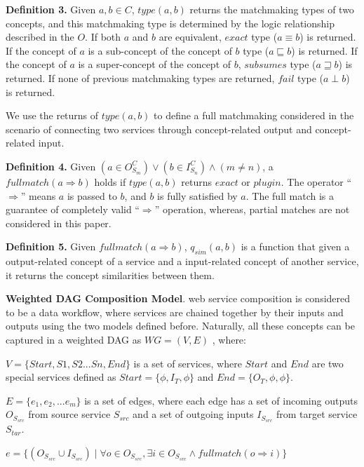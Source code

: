 \documentclass{llncs}
\begin{document}
\textbf{Definition 3.} Given $a, b \in C$, $type(a, b)$ returns the matchmaking types of two concepts, and this matchmaking type is determined by the logic relationship described in the $O$. If both $a$ and $b$ are equivalent, $exact$ type ($a \equiv b$) is returned. If the concept of $a$ is a sub-concept of the concept of $b$ type ($a \sqsubseteq b$) is returned. If the concept of $a$ is a super-concept of the concept of $b$, $subsumes$ type ($a \sqsupseteq b$) is returned. If none of previous matchmaking types are returned, $fail$ type ($a \perp b$) is returned.

We use the returns of $type(a, b)$ to define a full matchmaking considered in the scenario of connecting two services through concept-related output and concept-related input.

\textbf{Definition 4.} Given $(a \in O^{C}_{S_m}) \vee (b \in I^{C}_{S_n}) \wedge (m \neq n) $, a $full match(a \Rightarrow b)$ holds if $type(a, b)$ returns $exact$ or $plugin$. The operator ``$ \Rightarrow$'' means $a$ is passed to $b$, and $b$ is fully satisfied by $a$. The full match is a guarantee of completely valid  ``$ \Rightarrow$'' operation, whereas, partial matches are not considered in this paper.

\textbf{Definition 5.} Given $full match(a \Rightarrow b)$, $q_{sim}(a, b)$ is a function that given a output-related concept of a service and a input-related concept of another service, it returns the concept similarities between them.
\vspace{0.3cm}

\textbf{Weighted DAG Composition Model}. web service composition is considered to be a data workflow, where services are chained together by their inputs and outputs using the two models defined before. Naturally, all these concepts can be captured in a weighted DAG as $WG = (V, E)$ , where:

$V=\{Start, S1, S2...Sn, End\}$ is a set of services, where $Start$ and $End$ are two special services defined as $Start = \{ \phi, I_T, \phi \}$ and $End  = \{ O_T, \phi, \phi \}$. 

$E = \{e_{1}, e_{2},... e_{m} \}$ is a set of edges, where each edge has a set of incoming outputs $O_{S_{src}}$ from source service $S_{src}$ and a set of outgoing inputs $I_{S_{src}}$ from target service $S_{tar}$. 

$e = \{ (O_{S_{src}} \cup I_{S_{src}}) \mid \forall o \in O_{S_{src}}, \exists i \in O_{S_{src}} \wedge fullmatch (o \Rightarrow i) \}$
\vspace{0.5cm}
\end{document}
